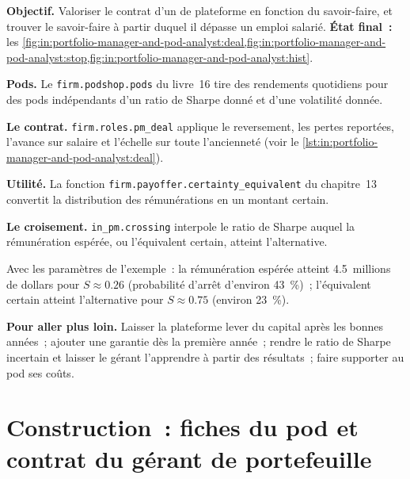 \begin{tutorial}
\textbf{Objectif.} Valoriser le contrat d'un  de plateforme en fonction du savoir-faire, et trouver le savoir-faire à partir duquel il dépasse un
emploi salarié.
\textbf{État final~:} les \cref{fig:in:portfolio-manager-and-pod-analyst:deal,fig:in:portfolio-manager-and-pod-analyst:stop,fig:in:portfolio-manager-and-pod-analyst:hist}.
\begin{tutsteps}
\item \textbf{Pods.} Le \texttt{firm.podshop.pods} du livre~16 tire des rendements quotidiens pour des pods indépendants d'un ratio de Sharpe donné
et d'une volatilité donnée.
\item \textbf{Le contrat.} \texttt{firm.roles.pm\_deal} applique le reversement, les pertes reportées, l'avance sur salaire et
l'échelle sur toute l'ancienneté (voir le \cref{lst:in:portfolio-manager-and-pod-analyst:deal}).
\label{lst:in:portfolio-manager-and-pod-analyst:deal}
\item \textbf{Utilité.} La fonction \texttt{firm.payoffer.certainty\_equivalent} du chapitre~13 convertit la distribution des rémunérations en un
montant certain.
\item \textbf{Le croisement.} \texttt{in\_pm.crossing} interpole le ratio de Sharpe auquel la rémunération espérée, ou
l'équivalent certain, atteint l'alternative.
\end{tutsteps}
\end{tutorial}

Avec les paramètres de l'exemple~: la rémunération espérée atteint 4.5~millions de dollars pour $S\approx0.26$ (probabilité d'arrêt d'environ 43~\%)~;
l'équivalent certain atteint l'alternative pour $S\approx0.75$ (environ 23~\%).

\textbf{Pour aller plus loin.} Laisser la plateforme lever du capital après les bonnes années~; ajouter une garantie dès la première année~; rendre le
ratio de Sharpe incertain et laisser le gérant l'apprendre à partir des résultats~; faire supporter au pod ses coûts.

\section{Construction~: fiches du pod et contrat du gérant de portefeuille}\label{bld:in:portfolio-manager-and-pod-analyst:roles}

